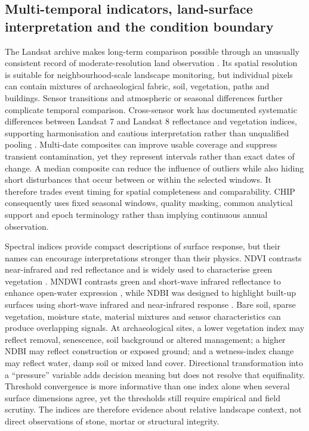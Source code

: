 \subsection{Multi-temporal indicators, land-surface interpretation and the condition boundary}

The Landsat archive makes long-term comparison possible through an unusually consistent record of moderate-resolution land observation \citep{hansen2012landsat,wulder2019landsat}. Its spatial resolution is suitable for neighbourhood-scale landscape monitoring, but individual pixels can contain mixtures of archaeological fabric, soil, vegetation, paths and buildings. Sensor transitions and atmospheric or seasonal differences further complicate temporal comparison. Cross-sensor work has documented systematic differences between Landsat 7 and Landsat 8 reflectance and vegetation indices, supporting harmonisation and cautious interpretation rather than unqualified pooling \citep{roy2016landsat}. Multi-date composites can improve usable coverage and suppress transient contamination, yet they represent intervals rather than exact dates of change. A median composite can reduce the influence of outliers while also hiding short disturbances that occur between or within the selected windows. It therefore trades event timing for spatial completeness and comparability. CHIP consequently uses fixed seasonal windows, quality masking, common analytical support and epoch terminology rather than implying continuous annual observation.

Spectral indices provide compact descriptions of surface response, but their names can encourage interpretations stronger than their physics. NDVI contrasts near-infrared and red reflectance and is widely used to characterise green vegetation \citep{tucker1979ndvi}. MNDWI contrasts green and short-wave infrared reflectance to enhance open-water expression \citep{xu2006mndwi}, while NDBI was designed to highlight built-up surfaces using short-wave infrared and near-infrared response \citep{zha2003ndbi}. Bare soil, sparse vegetation, moisture state, material mixtures and sensor characteristics can produce overlapping signals. At archaeological sites, a lower vegetation index may reflect removal, senescence, soil background or altered management; a higher NDBI may reflect construction or exposed ground; and a wetness-index change may reflect water, damp soil or mixed land cover. Directional transformation into a ``pressure'' variable adds decision meaning but does not resolve that equifinality. Threshold convergence is more informative than one index alone when several surface dimensions agree, yet the thresholds still require empirical and field scrutiny. The indices are therefore evidence about relative landscape context, not direct observations of stone, mortar or structural integrity.

